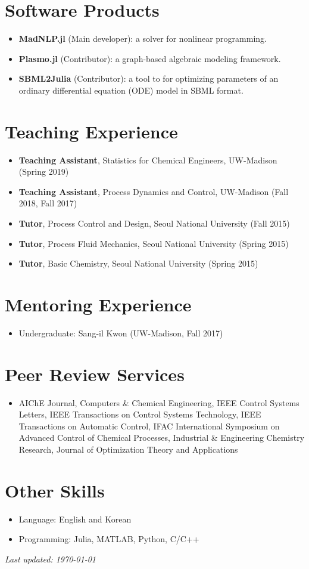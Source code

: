 \documentclass{article}
\begin{document}
\section*{Software Products}
\begin{itemize}[leftmargin=*]
\item[] {\bf MadNLP.jl} (Main developer): a solver for nonlinear programming.
\item[] {\bf Plasmo.jl} (Contributor): a graph-based algebraic modeling framework.
\item[] {\bf SBML2Julia} (Contributor): a tool to for optimizing parameters of an ordinary differential equation (ODE) model in SBML format.
\end{itemize}

\section*{Teaching Experience}
\begin{itemize}[leftmargin=*]
\item[] {\bf Teaching Assistant}, Statistics for Chemical Engineers, UW-Madison (Spring 2019)
\item[] {\bf Teaching Assistant}, Process Dynamics and Control, UW-Madison (Fall 2018, Fall 2017)
\item[] {\bf Tutor}, Process Control and Design, Seoul National University (Fall 2015)
\item[] {\bf Tutor}, Process Fluid Mechanics, Seoul National University (Spring 2015)
\item[] {\bf Tutor}, Basic Chemistry, Seoul National University (Spring 2015)
\end{itemize}

\section*{Mentoring Experience}
\begin{itemize}[leftmargin=*]
\item[] Undergraduate: Sang-il Kwon (UW-Madison, Fall 2017)
\end{itemize}

\section*{Peer Review Services}
\begin{itemize}[leftmargin=*]
\item[] AIChE Journal, Computers \& Chemical Engineering, IEEE Control Systems Letters, IEEE Transactions on Control Systems Technology, IEEE Transactions on Automatic Control, IFAC International Symposium on Advanced Control of Chemical Processes, Industrial \& Engineering Chemistry Research, Journal of Optimization Theory and Applications
\end{itemize}

\section*{Other Skills}
\begin{itemize}[leftmargin=*]
\item[] Language: English and Korean
\item[] Programming: Julia, MATLAB, Python, C/C++
\end{itemize}

{\it Last updated: \today}
\end{document}
